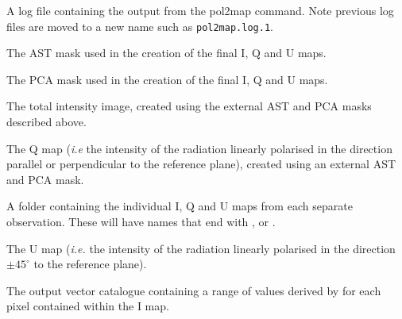 \begin{aligndesc}
\item[\file{pol2map.log}] A log file containing the output from the
  pol2map command. Note previous log files are moved to a new name
  such as \texttt{pol2map.log.1}.

\item[\file{astmask.sdf}] The AST mask used in the creation
  of the final I, Q and U maps.

\item[\file{pcamask.sdf}] The PCA mask used in the creation of the
  final I, Q and U maps.

\item[\file{iext.sdf}] The total intensity image, created using the
  external AST and PCA masks described above.

\item[\file{qext.sdf}] The Q map (\emph{i.e} the intensity of the radiation
  linearly polarised in the direction parallel or perpendicular to the
  reference plane), created using an external AST and PCA mask.

\item[\file{maps/}] A folder containing the individual I, Q and U
  maps from each separate observation. These will have names that end with
  ,  or .

\item[\file{uext.sdf}] The U map (\emph{i.e.} the intensity of the radiation
  linearly polarised in the direction $\pm45^{\circ }$ to the reference plane).

\item[\file{mycat.FIT}] The output vector catalogue containing a
  range of values derived by  for each pixel contained within
  the I map.

\end{aligndesc}


